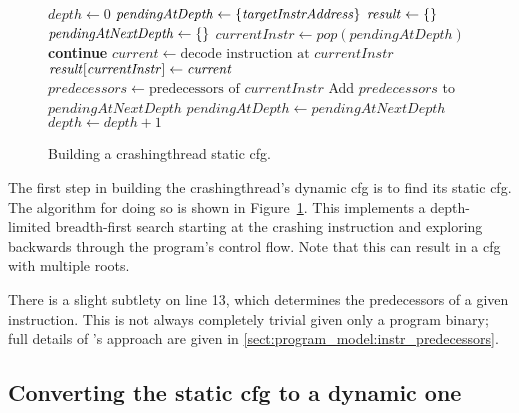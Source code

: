\begin{figure}
\begin{algorithmic}[1]
\State $\mathit{depth} \gets 0$
\State $\mathit{pendingAtDepth} \gets \{\mathit{targetInstrAddress}\}$
\State $\mathit{result} \gets \{\}$
  \State $\mathit{pendingAtNextDepth} \gets \{\}$
    \State $\mathit{currentInstr} \gets \mathit{pop}(\mathit{pendingAtDepth})$
      \State \textbf{continue}
    \EndIf
    \State $\mathit{current} \gets \text{decode instruction at } \mathit{currentInstr}$
    \State $\mathit{result}[\mathit{currentInstr}] \gets \mathit{current}$
    \State $\mathit{predecessors} \gets \text{predecessors of } \mathit{currentInstr}$
    \State Add $\mathit{predecessors}$ to $\mathit{pendingAtNextDepth}$
  \EndWhile
  \State $\mathit{pendingAtDepth} \gets \mathit{pendingAtNextDepth}$
  \State $\mathit{depth} \gets \mathit{depth} + 1$
\EndWhile
\end{algorithmic}
\vspace{-6pt}
\caption{Building a \gls{crashingthread} static \gls{cfg}.}
\label{fig:derive:static_read_cfg_single_function}
\end{figure}

The first step in building the \gls{crashingthread}'s dynamic
\gls{cfg} is to find its static \gls{cfg}.  The algorithm for doing so
is shown in Figure~\ref{fig:derive:static_read_cfg_single_function}.
This implements a depth-limited breadth-first search starting at the
crashing instruction and exploring backwards through the program's
control flow.  Note that this can result in a \gls{cfg} with multiple
roots.

There is a slight subtlety on line 13, which determines the
predecessors of a given instruction.  This is not always completely
trivial given only a program binary; full details of {\technique}'s
approach are given in \autoref{sect:program_model:instr_predecessors}.

\subsection[Converting the static \glsentrytext{cfg} to a dynamic one]{Converting the static \gls{cfg} to a dynamic one}
\label{sect:derive:handling_loops}


